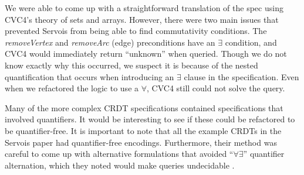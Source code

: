 \documentclass{article}
\begin{document}
We were able to come up with a straightforward translation of the spec using
CVC4's theory of sets and arrays. However, there were two main issues that
prevented Servois from being able to find commutativity conditions. The
\textit{removeVertex} and \textit{removeArc} (edge) preconditions have an
$\exists$ condition, and CVC4 would immediately return ``unknown'' when queried.
Though we do not know exactly why this occurred, we suspect it is because of the
nested quantification that occurs when introducing an $\exists$ clause in the
specification. Even when we refactored the logic to use a $\forall$, CVC4 still
could not solve the query.

Many of the more complex CRDT specifications contained specifications that
involved quantifiers. It would be interesting to see if these could be
refactored to be quantifier-free. It is important to note that all the example
CRDTs in the Servois paper had quantifier-free encodings. Furthermore, their
method was careful to come up with alternative formulations that avoided
``$\forall\exists$'' quantifier alternation, which they noted would make queries
undecidable \cite{bansal2018servois}.



\end{document}
